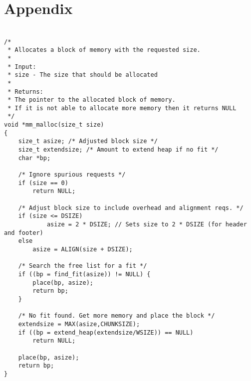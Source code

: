 \section*{Appendix}
\appendix


\section{} \label{appendix:malloc}
\begin{lstlisting}
/* 
 * Allocates a block of memory with the requested size.
 * 
 * Input:
 * size - The size that should be allocated
 * 
 * Returns:
 * The pointer to the allocated block of memory. 
 * If it is not able to allocate more memory then it returns NULL
 */
void *mm_malloc(size_t size)
{
    size_t asize; /* Adjusted block size */
    size_t extendsize; /* Amount to extend heap if no fit */
    char *bp;

    /* Ignore spurious requests */
    if (size == 0)
        return NULL;

    /* Adjust block size to include overhead and alignment reqs. */
    if (size <= DSIZE)
            asize = 2 * DSIZE; // Sets size to 2 * DSIZE (for header and footer)
    else
        asize = ALIGN(size + DSIZE); 

    /* Search the free list for a fit */
    if ((bp = find_fit(asize)) != NULL) {
        place(bp, asize);
        return bp; 
    }

    /* No fit found. Get more memory and place the block */
    extendsize = MAX(asize,CHUNKSIZE);
    if ((bp = extend_heap(extendsize/WSIZE)) == NULL)
        return NULL;

    place(bp, asize);
    return bp;
}
\end{lstlisting}


